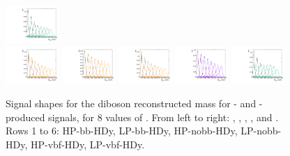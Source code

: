 \begin{figure}[htbp]
  \includegraphics[width=0.18\textwidth]{fig/2Dfit/templateSignalVsMX_fromDC_WprToWH_MVV_mu_HP_vbf_HDy.pdf}\\
  \includegraphics[width=0.18\textwidth]{fig/2Dfit/templateSignalVsMX_fromDC_GbuToWW_MVV_mu_LP_vbf_HDy.pdf}
  \includegraphics[width=0.18\textwidth]{fig/2Dfit/templateSignalVsMX_fromDC_RadToWW_MVV_mu_LP_vbf_HDy.pdf}
  \includegraphics[width=0.18\textwidth]{fig/2Dfit/templateSignalVsMX_fromDC_ZprToWW_MVV_mu_LP_vbf_HDy.pdf}
  \includegraphics[width=0.18\textwidth]{fig/2Dfit/templateSignalVsMX_fromDC_WprToWZ_MVV_mu_LP_vbf_HDy.pdf}
  \includegraphics[width=0.18\textwidth]{fig/2Dfit/templateSignalVsMX_fromDC_WprToWH_MVV_mu_LP_vbf_HDy.pdf}\\
  \caption{
    Signal shapes for the diboson reconstructed mass \MVV for \ggF- and \DY-produced signals, for 8 values of \MX.
    From left to right: \GBulktoWW, \RadtoWW, \ZprtoWW, \WprtoWZ, and \WprtoWH.
    Rows 1 to 6: HP-bb-HDy, LP-bb-HDy, HP-nobb-HDy, LP-nobb-HDy, HP-vbf-HDy, LP-vbf-HDy.
  }
  \label{fig:MVVShapes_NonVBF_HDy_Run2}
\end{figure}

